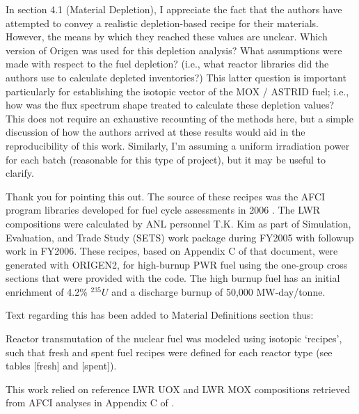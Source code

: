 \documentclass[answers,11pt]{exam}
\begin{document}
\begin{questions}
        \question In section 4.1 (Material Depletion), I appreciate the fact 
        that the authors have attempted to convey a realistic depletion-based 
        recipe for their materials. However, the means by which they reached 
        these values are unclear. Which version of Origen was used for this 
        depletion analysis? What assumptions were made with respect to the fuel 
        depletion? (i.e., what reactor libraries did the authors use to 
        calculate depleted inventories?) This latter question is important 
        particularly for establishing the isotopic vector of the MOX / ASTRID 
        fuel; i.e., how was the flux spectrum shape treated to calculate these 
        depletion values? This does not require an exhaustive recounting of the 
        methods here, but a simple discussion of how the authors arrived at 
        these results would aid in the reproducibility of this work. Similarly, 
        I'm assuming a uniform irradiation power for each batch (reasonable for 
        this type of project), but it may be useful to clarify. 
        \begin{solution}
                Thank you for pointing this out. The source of these recipes 
                was the \gls{AFCI} program libraries developed for fuel cycle 
                assessments in 2006 \cite{piet_fuel_2006}. The \gls{LWR} compositions 
                were calculated by \gls{ANL} personnel T.K. Kim as part of 
                Simulation, Evaluation, and Trade Study (SETS) work 
                package during FY2005 with followup work in FY2006. These 
                recipes, based on Appendix C of that document, were generated with 
                ORIGEN2, for high-burnup \gls{PWR} fuel using the one-group 
                cross sections that were provided with the code.  The high 
                burnup fuel has an initial enrichment of 4.2\% $^{235}U$ and a 
                discharge burnup of 50,000 MW-day/tonne. 


                Text regarding this has been added to Material Definitions 
                section thus:

                Reactor transmutation of the nuclear fuel was modeled using 
                isotopic `recipes', such that fresh and spent fuel recipes were 
                defined for each reactor type (see tables [fresh] 
                and [spent]).
                
                This work relied on reference \gls{LWR} \gls{UOX} and \gls{LWR} \gls{MOX} 
                compositions retrieved from \gls{AFCI} analyses in Appendix C 
                of \cite{piet_fuel_2006}.
                

\end{solution}
\end{questions}
\end{document}
